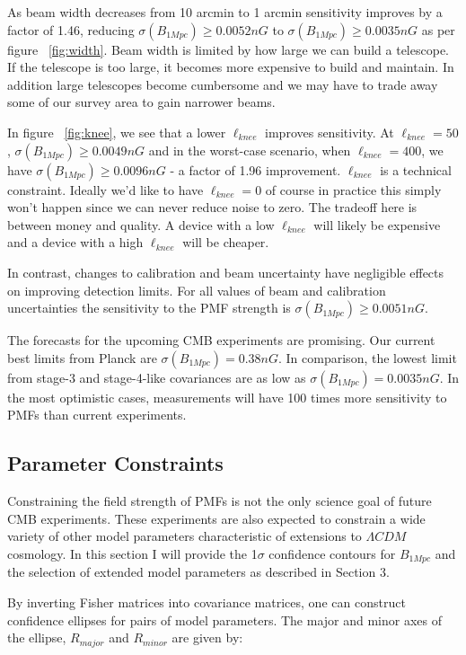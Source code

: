 As beam width decreases from 10 arcmin to 1 arcmin sensitivity improves by a factor of 1.46, reducing $\sigma(B_{1Mpc}) \geq 0.0052nG$ to $\sigma(B_{1Mpc}) \geq 0.0035nG$ as per figure ~\ref{fig:width}. Beam width is limited by how large we can build a telescope. If the telescope is too large, it becomes more expensive to build and maintain. In addition large telescopes become cumbersome and we may have to trade away some of our survey area to gain narrower beams.

In figure ~\ref{fig:knee}, we see that a lower $\ell_{knee}$ improves sensitivity. At $\ell_{knee} = 50$, $\sigma(B_{1Mpc}) \geq 0.0049nG$ and in the worst-case scenario, when $\ell_{knee} = 400$, we have $\sigma(B_{1Mpc}) \geq 0.0096nG$ - a factor of 1.96 improvement. $\ell_{knee}$ is a technical constraint. Ideally we'd like to have $\ell_{knee} = 0$ of course in practice this simply won't happen since we can never reduce noise to zero. The tradeoff here is between money and quality. A device with a low $\ell_{knee}$ will likely be expensive and a device with a high $\ell_{knee}$ will be cheaper. 

In contrast, changes to calibration and beam uncertainty have negligible effects on improving detection limits. For all values of beam and calibration uncertainties the sensitivity to the PMF strength is $\sigma(B_{1Mpc}) \geq 0.0051nG$.

The forecasts for the upcoming CMB experiments are promising. Our current best limits from Planck are $\sigma(B_{1Mpc}) = 0.38nG$. In comparison, the lowest limit from stage-3 and stage-4-like covariances are as low as $\sigma(B_{1Mpc}) = 0.0035nG$. In the most optimistic cases, measurements will have 100 times more sensitivity to PMFs than current experiments.

\subsection{Parameter Constraints}

Constraining the field strength of PMFs is not the only science goal of future CMB experiments. These experiments are also expected to constrain a wide variety of other model parameters characteristic of extensions to $\Lambda CDM$ cosmology. In this section I will provide the 1$\sigma$ confidence contours for $B_{1Mpc}$ and the selection of extended model parameters as described in Section 3.

By inverting Fisher matrices into covariance matrices, one can construct confidence ellipses for pairs of model parameters. The major and minor axes of the ellipse, $R_{major}$ and $R_{minor}$ are given by:

